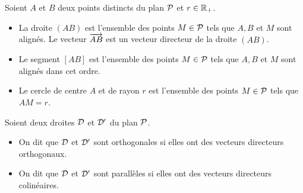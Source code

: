Soient \(A\) et \(B\) deux points distincts du plan \(\P\) et \(r \in \R_+\).
\begin{itemize}
  \item La droite \((AB)\) est l'ensemble des points \(M \in \P\) tels que \(A, B\) et 
    \(M\) sont alignés. Le vecteur \(\vect{AB}\) est un vecteur directeur de la 
    droite \((AB)\).
  \item Le segment \([AB]\) est l'ensemble des points \(M \in \P\) tels que \(A, B\) 
    et \(M\) sont alignés dans cet ordre.
  \item Le cercle de centre \(A\) et de rayon \(r\) est l'ensemble des points $M \in 
    \P$ tels que \(AM=r\).
\end{itemize}
Soient deux droites \(\Dr\) et \(\Dr'\) du plan \(\P\).
\begin{itemize}
  \item On dit que \(\Dr\) et \(\Dr'\) sont orthogonales si elles ont des vecteurs 
    directeurs orthogonaux.
  \item On dit que \(\Dr\) et \(\Dr'\) sont parallèles si elles ont des vecteurs 
    directeurs colinéaires.
\end{itemize}
